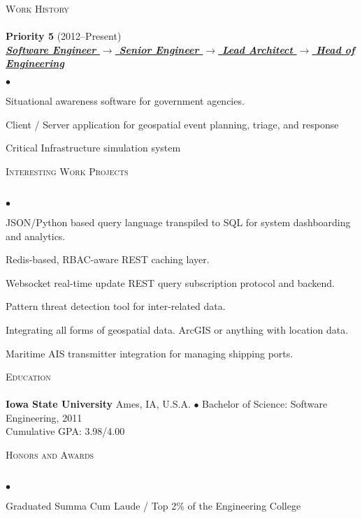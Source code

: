 \documentclass{article}
\newcommand{\lineunder} {
	\vspace*{-8pt} \\ \hspace*{-18pt} \hrulefill \\
}
\newcommand{\header}[1] {
	{\hspace*{-15pt}\vspace*{6pt} \textsc{#1}} \vspace*{-6pt} \lineunder
}
\newcommand{\employer}[3] {
	{ \textbf{#1} (#2)\\ \underline{\textbf{\emph{#3}}}\\  }
}
\newenvironment{achievements} {
	\begin{list}{$\bullet$}
		{\topsep 0pt \itemsep -2pt}
	}{
		\vspace*{4pt}\end{list}
	}
\newcommand{\school}[4] {
	\textbf{#1} #2 $\bullet$ #3\\
	\hspace*{15pt}#4 \\
	\vspace*{5pt}
}
\begin{document}
\header{Work History}

   \employer{Priority 5}{2012--Present}{Software Engineer \(\rightarrow\) Senior Engineer \(\rightarrow\) Lead Architect \(\rightarrow\) Head of Engineering}
		\begin{achievements}
         \item{Situational awareness software for government agencies.}
         \item{Client / Server application for geospatial event planning, triage, and response}
         \item{Critical Infrastructure simulation system}
		\end{achievements}

\header{Interesting Work Projects}

	\begin{achievements}
      \item{JSON/Python based query language transpiled to SQL for system dashboarding and analytics.}
      \item{Redis-based, RBAC-aware REST caching layer.}
      \item{Websocket real-time update REST query subscription protocol and backend.}
      \item{Pattern threat detection tool for inter-related data.}
      \item{Integrating all forms of geospatial data. ArcGIS or anything with location data.}
      \item{Maritime AIS transmitter integration for managing shipping ports.}
   \end{achievements}

\header{Education}

	\school{Iowa State University}{Ames, IA, U.S.A.}{Bachelor of Science: Software Engineering, 2011}
	{Cumulative GPA: 3.98/4.00}

\header{Honors and Awards}

	\begin{achievements}
		\item{Graduated Summa Cum Laude / Top 2\% of the Engineering College}
	\end{achievements}
\end{document}

